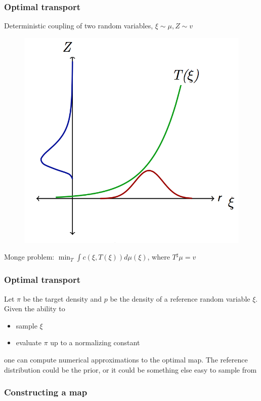 \documentclass[table]{beamer}
\begin{document}
\begin{CJK}{UTF8}{gbsn}
\begin{frame}
  \frametitle{Optimal transport}
Deterministic coupling of two random variables, $\xi \sim \mu, Z \sim v$
\begin{figure}
\includegraphics[scale=0.2]{img/optimaltransportmap.png}
\end{figure}

Monge problem: $\min_{T} \int c(\xi,T(\xi)) d \mu (\xi)$, where $T^{\sharp} \mu = v$
\end{frame}
\begin{frame}
  \frametitle{Optimal transport}
Let $\pi$ be the target density and $p$ be the density of a reference random variable $\xi$.
Given the ability to
\begin{itemize}
\item sample $\xi$
\item evaluate $\pi$ up to a normalizing constant
\end{itemize}
one can compute numerical approximations to the optimal map.
\hfill
The reference distribution could be the prior, or it could be something else easy to sample from
\end{frame}
\begin{frame}
\frametitle{Constructing a map}


\end{frame}
\end{CJK}
\end{document}
